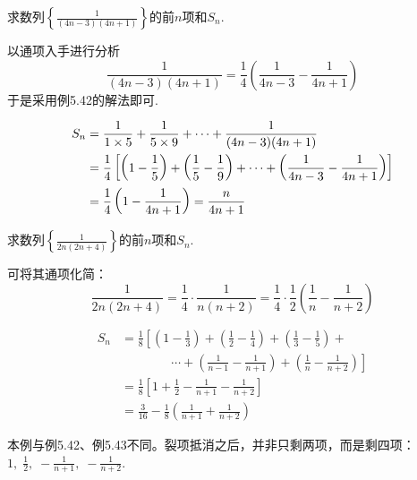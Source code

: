 \begin{example}
    求数列$\left\{\frac{1}{(4n-3)(4n+1)}\right\}$的前$n$项和$S_n$.
\end{example}

\begin{analyze}
以通项入手进行分析
\[\frac{1}{(4n-3)(4n+1)}=\frac{1}{4}\left(\frac{1}{4n-3}-\frac{1}{4n+1}\right)\]
于是采用例5.42的解法即可.
\end{analyze}

\begin{solution}
\[\begin{split}
S_n&=\dfrac{1}{1\times 5}+\dfrac{1}{5\times 9}+\cdots +\dfrac{1}{(4n-3)(4n+1)}\\
&=\dfrac{1}{4}\left[\left(1-\dfrac{1}{5}\right)+\left(\dfrac{1}{5}-\dfrac{1}{9}\right)+\cdots +\left(\dfrac{1}{4n-3}-\dfrac{1}{4n+1}\right)\right]\\
&=\dfrac{1}{4}\left(1-\dfrac{1}{4n+1}\right)=\dfrac{n}{4n+1}
\end{split}\]    
\end{solution}


\begin{example}
    求数列$\left\{\frac{1}{2n(2n+4)}\right\}$的前$n$项和$S_n$.
\end{example}

\begin{analyze}
    可将其通项化简：
\[\frac{1}{2n(2n+4)}=\frac{1}{4}\cdot \frac{1}{n(n+2)}=\frac{1}{4}\cdot \frac{1}{2}\left(\frac{1}{n}-\frac{1}{n+2}\right)\]
\end{analyze}

\begin{solution}
\[\begin{split}
S_n&=\frac{1}{8}\left[\left(1-\frac{1}{3}\right)+\left(\frac{1}{2}-\frac{1}{4}\right)+\left(\frac{1}{3}-\frac{1}{5}\right)+\right.\\
&\qquad \qquad \left.\cdots +\left(\frac{1}{n-1}-\frac{1}{n+1}\right)+\left(\frac{1}{n}-\frac{1}{n+2}\right)\right]\\
&=\frac{1}{8}\left[1+\frac{1}{2}-\frac{1}{n+1}-\frac{1}{n+2}\right]\\
&=\frac{3}{16}-\frac{1}{8}\left(\frac{1}{n+1}+\frac{1}{n+2}\right)
\end{split}\]
\end{solution}

\begin{rmk}
本例与例5.42、例5.43不同。裂项抵消之后，并非只剩两项，而是剩四项：$1,\; \frac{1}{2},\; -\frac{1}{n+1},\; -\frac{1}{n+2}$.
\end{rmk}
    
